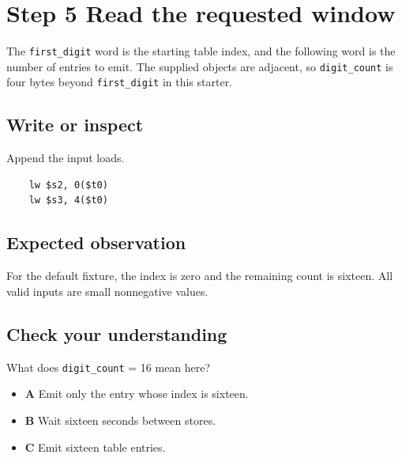 \section{Step 5 Read the requested
  window}\label{005-seven-segment-counter-s05-step-5-read-the-requested-window}

The \texttt{first\_digit} word is the starting table index, and the
following word is the number of entries to emit. The supplied objects
are adjacent, so \texttt{digit\_count} is four bytes beyond
\texttt{first\_digit} in this starter.

\subsection{Write or
  inspect}\label{005-seven-segment-counter-s05-write-or-inspect}

Append the input loads.

\begin{verbatim}
    lw $s2, 0($t0)
    lw $s3, 4($t0)
\end{verbatim}

\subsection{Expected
  observation}\label{005-seven-segment-counter-s05-expected-observation}

For the default fixture, the index is zero and the remaining count is
sixteen. All valid inputs are small nonnegative values.

\subsection{Check your
  understanding}\label{005-seven-segment-counter-s05-check-your-understanding}

What does \texttt{digit\_count} = 16 mean here?

\begin{itemize}
  \tightlist
  \item
        \textbf{A} Emit only the entry whose index is sixteen.
  \item
        \textbf{B} Wait sixteen seconds between stores.
  \item
        \textbf{C} Emit sixteen table entries.
\end{itemize}
